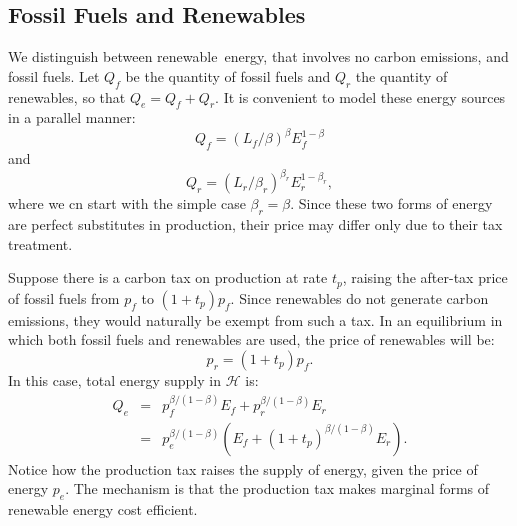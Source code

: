 \documentclass[notitlepage,12pt]{article}
\begin{document}
\subsection{Fossil Fuels and Renewables}

We distinguish between renewable\ energy, that involves no carbon emissions,
and fossil fuels. Let $Q_{f}$ be the quantity of fossil fuels and $Q_{r}$
the quantity of renewables, so that $Q_{e}=Q_{f}+Q_{r}$. It is convenient to
model these energy sources in a parallel manner:%
\begin{equation*}
Q_{f}=\left( L_{f}/\beta \right) ^{\beta }E_{f}^{1-\beta }
\end{equation*}%
and%
\begin{equation*}
Q_{r}=\left( L_{r}/\beta _{r}\right) ^{\beta _{r}}E_{r}^{1-\beta _{r}},
\end{equation*}%
where we cn start with the simple case $\beta _{r}=\beta $. Since these two
forms of energy are perfect substitutes in production, their price may
differ only due to their tax treatment.

Suppose there is a carbon tax on production at rate $t_{p}$, raising the
after-tax price of fossil fuels from $p_{f}$ to $(1+t_{p})p_{f}$. Since
renewables do not generate carbon emissions, they would naturally be exempt
from such a tax. In an equilibrium in which both fossil fuels and renewables
are used, the price of renewables will be:%
\begin{equation*}
p_{r}=(1+t_{p})p_{f}.
\end{equation*}%
In this case, total energy supply in $\mathcal{H}$ is:%
\begin{eqnarray*}
Q_{e} &=&p_{f}^{\beta /(1-\beta )}E_{f}+p_{r}^{\beta /(1-\beta )}E_{r} \\
&=&p_{e}^{\beta /(1-\beta )}\left( E_{f}+\left( 1+t_{p}\right) ^{\beta
/(1-\beta )}E_{r}\right) .
\end{eqnarray*}%
Notice how the production tax raises the supply of energy, given the price
of energy $p_{e}$. The mechanism is that the production tax makes marginal
forms of renewable energy cost efficient.
\end{document}
